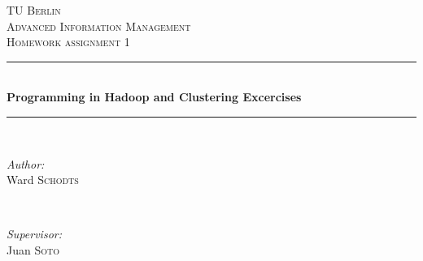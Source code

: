 \documentclass[11pt,a4paper]{article}
\begin{document}
\begin{titlepage}

\newcommand{\HRule}{\rule{\linewidth}{0.5mm}} %

\center %
 

\textsc{\textsc{\LARGE TU Berlin}}\\[1.5cm] %
\textsc{\Large Advanced Information Management}\\[0.5cm] %
\textsc{\large Homework assignment 1}\\[0.5cm] %


\HRule \\[0.4cm]
{ \huge \bfseries Programming in Hadoop and Clustering Excercises}\\[0.4cm] %
\HRule \\[1.5cm]
 

\begin{minipage}{0.4\textwidth}
\begin{flushleft} \large
\emph{Author:}\\
Ward \textsc{Schodts} %
\end{flushleft}
\end{minipage}
~
\begin{minipage}{0.4\textwidth}
\begin{flushright} \large
\emph{Supervisor:} \\
Juan \textsc{Soto} \\ %

\end{flushright}
\end{minipage}\\[4cm]


\end{titlepage}
\end{document}
